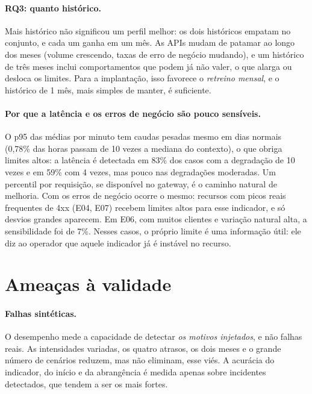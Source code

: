 \documentclass[sigconf,nonacm]{acmart}
\begin{document}
\paragraph{RQ3: quanto histórico.} Mais histórico não significou um perfil melhor: os dois históricos empatam no conjunto, e cada um ganha em um mês. As APIs mudam de patamar ao longo dos meses (volume crescendo, taxas de erro de negócio mudando), e um histórico de três meses inclui comportamentos que podem já não valer, o que alarga ou desloca os limites. Para a implantação, isso favorece o \emph{retreino mensal}, e o histórico de 1 mês, mais simples de manter, é suficiente.

\paragraph{Por que a latência e os erros de negócio são pouco sensíveis.} O p95 das médias por minuto tem caudas pesadas mesmo em dias normais (0,78\% das horas passam de 10 vezes a mediana do contexto), o que obriga limites altos: a latência é detectada em 83\% dos casos com a degradação de 10 vezes e em 59\% com 4 vezes, mas pouco nas degradações moderadas. Um percentil por requisição, se disponível no gateway, é o caminho natural de melhoria. Com os erros de negócio ocorre o mesmo: recursos com picos reais frequentes de 4xx (E04, E07) recebem limites altos para esse indicador, e só desvios grandes aparecem. Em E06, com muitos clientes e variação natural alta, a sensibilidade foi de 7\%. Nesses casos, o próprio limite é uma informação útil: ele diz ao operador que aquele indicador já é instável no recurso.

\section{Ameaças à validade}\label{sec:ameacas}

\paragraph{Falhas sintéticas.} O desempenho mede a capacidade de detectar \emph{os motivos injetados}, e não falhas reais. As intensidades variadas, os quatro atrasos, os dois meses e o grande número de cenários reduzem, mas não eliminam, esse viés. A acurácia do indicador, do início e da abrangência é medida apenas sobre incidentes detectados, que tendem a ser os mais fortes.
\end{document}
